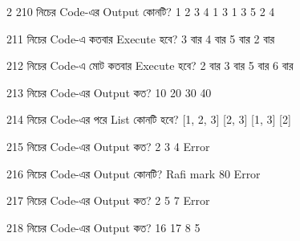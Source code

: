 \begin{multicols}{2}
\mcqwide
{210}
{নিচের Code-এর Output কোনটি?}
{1 2 3 4}
{1 3}
{1 3 5}
{2 4}

\mcqwide
{211}
{নিচের Code-এ  কতবার Execute হবে?}
{3 বার}
{4 বার}
{5 বার}
{2 বার}

\mcqwide
{212}
{নিচের Code-এ  মোট কতবার Execute হবে?}
{2 বার}
{3 বার}
{5 বার}
{6 বার}

\mcqwide
{213}
{নিচের Code-এর Output কত?}
{10}
{20}
{30}
{40}

\mcqwide
{214}
{নিচের Code-এর পরে List কোনটি হবে?}
{[1, 2, 3]}
{[2, 3]}
{[1, 3]}
{[2]}

\mcqwide
{215}
{নিচের Code-এর Output কত?}
{2}
{3}
{4}
{Error}

\mcqwide
{216}
{নিচের Code-এর Output কোনটি?}
{Rafi}
{mark}
{80}
{Error}

\mcqwide
{217}
{নিচের Code-এর Output কত?}
{2}
{5}
{7}
{Error}

\mcqwide
{218}
{নিচের Code-এর Output কত?}
{16}
{17}
{8}
{5}


\end{multicols}
